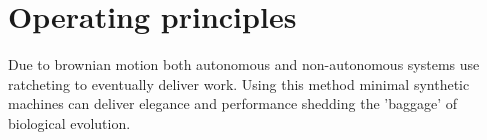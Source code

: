 \section{Operating principles}

Due to brownian motion both autonomous and non-autonomous systems use ratcheting to
eventually deliver work. Using this method minimal synthetic machines can deliver
elegance and performance shedding the 'baggage' of biological evolution.
